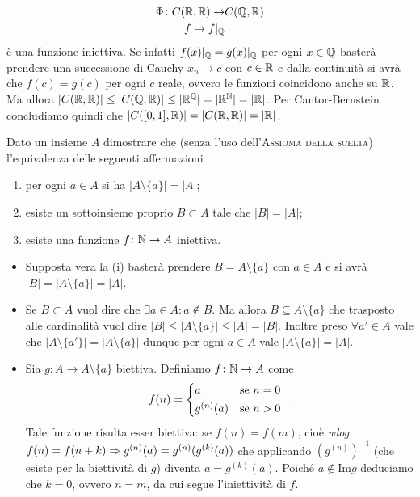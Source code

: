 \documentclass[a4paper]{article}\par \usepackage{style}\par
\begin{document}
\begin{enumerate}
  \begin{align*}
    \Phi \colon C(\mathbb{R}, \mathbb{R}) \to & C(\mathbb{Q}, \mathbb{R}) \\
    f \mapsto f |_{\mathbb{Q}}
  \end{align*}
  è una funzione iniettiva. Se infatti $ f(x)|_{\mathbb{Q}} = g(x)|_{\mathbb{Q}} $ per ogni $ x \in \mathbb{Q} $ basterà prendere una successione di Cauchy $ x_n \to c $ con $ c \in \mathbb{R} $ e dalla continuità si avrà che $ f(c) = g(c) $ per ogni $ c $ reale, ovvero le funzioni coincidono anche su $ \mathbb{R} $. Ma allora $ |C(\mathbb{R}, \mathbb{R})|\leq |C(\mathbb{Q}, \mathbb{R})| \leq |\mathbb{R}^{\mathbb{Q}}| = |\mathbb{R}^{\mathbb{N}}| = |\mathbb{R}| $. Per Cantor-Bernstein concludiamo quindi che $ |C([0, 1], \mathbb{R})| = |C(\mathbb{R}, \mathbb{R})| = |\mathbb{R}| $.
\end{enumerate}\par \begin{es}
  Dato un insieme $ A $ dimostrare che (senza l'uso dell'\textsc{Assioma della scelta}) l'equivalenza delle seguenti affermazioni
  \begin{enumerate}[label=(\roman*)]
  \item per ogni $ a \in A $ si ha $ |A \setminus \{a\}| = |A| $;
  \item esiste un sottoinsieme proprio $ B \subset A $ tale che $ |B| = |A| $;
  \item esiste una funzione $ f \colon \mathbb{N} \to A $ iniettiva.
  \end{enumerate}
\end{es}
\begin{itemize}[label = (i) $ \Rightarrow $ (ii)]
\item Supposta vera la (i) basterà prendere $ B = A \setminus \{a\} $ con $ a \in A $ e si avrà $ |B| = |A \setminus \{a\}| = |A| $.
\end{itemize}
\begin{itemize}[label = (ii) $ \Rightarrow $ (i)]
\item Se $ B \subset A $ vuol dire che $ \exists a \in A : a \notin B $. Ma allora $ B \subseteq A \setminus \{a\} $ che trasposto alle cardinalità vuol dire $ |B| \leq |A \setminus \{a\}| \leq |A| = |B| $. Inoltre preso $ \forall a' \in A $ vale che $ |A \setminus \{a'\}| = |A \setminus \{a\}| $ dunque per ogni $ a \in A $ vale $ |A \setminus \{a\}| = |A| $.
\end{itemize}
\begin{itemize}[label = (i) $ \Rightarrow $ (iii)]
\item Sia $ g \colon A \to A \setminus \{a\} $ biettiva. Definiamo $ f \colon \mathbb{N} \to A $ come
  \[f(n) =
    \begin{cases*}
      a & \text{se $ n = 0 $} \\
      g^{(n)}(a) & \text{se $ n > 0 $}
    \end{cases*}.\]
  Tale funzione risulta esser biettiva: se $ f(n) = f(m) $, cioè \emph{wlog} $ f(n) = f(n + k) \Rightarrow \linebreak g^{(n)}(a) = g^{(n)}(g^{(k)}(a)) $ che applicando $ \left(g^{(n)}\right)^{-1} $ (che esiste per la biettività di $ g $) diventa $ a = g^{(k)}(a) $. Poiché $ a \notin \mathrm{Im}g $ deduciamo che $ k = 0 $, ovvero $ n = m $, da cui segue l'iniettività di $ f $.
\end{itemize}
\end{document}
